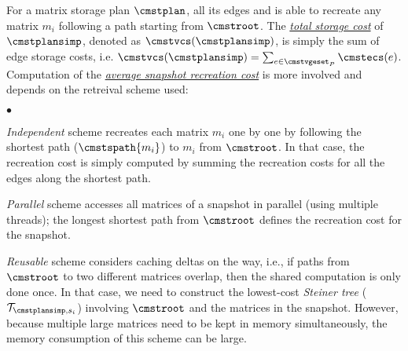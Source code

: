\documentclass[conference]{IEEEtran}
\begin{document}
For a matrix storage plan $\cmstplan$, \weightstore\stores all its edges and is able to recreate any matrix $m_i$ following a path starting from $\cmstroot$. The \underline{\emph{total storage cost}} of $\cmstplansimp$, denoted as $\cmstvcs(\cmstplansimp)$, is simply the sum of edge storage costs, i.e.
$\cmstvcs(\cmstplansimp) = \sum_{e\in\cmstvgeset_P} \cmstecs(e)$. 
Computation of the  \underline{\emph{average snapshot recreation cost}} is more involved and depends on the retreival scheme used:
\begin{list}{$\bullet$}{\leftmargin 0.10in \topsep -2pt} %
\item \emph{Independent} scheme recreates each matrix $m_i$ one by one by following the shortest path ($\cmstspath{m_i}$) to $m_i$ from $\cmstroot$. In that case, the recreation cost is simply computed by summing the recreation costs for all the edges along the shortest path.

\item \emph{Parallel} scheme accesses all matrices of a snapshot in parallel (using multiple threads); the longest shortest path from $\cmstroot$ defines the recreation cost for the snapshot. 
\item \emph{Reusable} scheme considers caching deltas on the way, i.e., if paths from $\cmstroot$ to two different matrices overlap, then the shared computation is only done once. In that case, we need to construct the lowest-cost {\em Steiner tree} ($\mathcal{T}_{\cmstplansimp, s_i}$) involving $\cmstroot$ and the matrices in the snapshot. However, because multiple large matrices need to be kept in memory simultaneously, the memory consumption of this scheme can be large.
\end{list}
\end{document}
